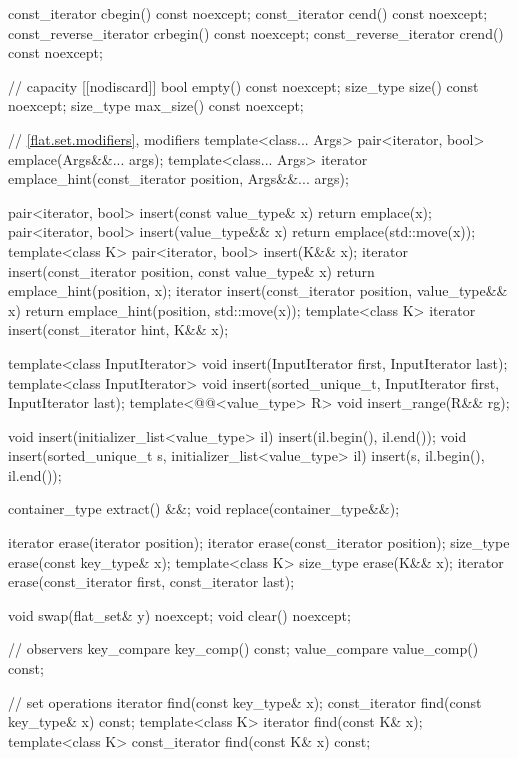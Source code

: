 \begin{codeblock}
{{    const_iterator         cbegin() const noexcept;
    const_iterator         cend() const noexcept;
    const_reverse_iterator crbegin() const noexcept;
    const_reverse_iterator crend() const noexcept;

    // capacity
    [[nodiscard]] bool empty() const noexcept;
    size_type size() const noexcept;
    size_type max_size() const noexcept;

    // \ref{flat.set.modifiers}, modifiers
    template<class... Args> pair<iterator, bool> emplace(Args&&... args);
    template<class... Args>
      iterator emplace_hint(const_iterator position, Args&&... args);

    pair<iterator, bool> insert(const value_type& x)
      { return emplace(x); }
    pair<iterator, bool> insert(value_type&& x)
      { return emplace(std::move(x)); }
    template<class K> pair<iterator, bool> insert(K&& x);
    iterator insert(const_iterator position, const value_type& x)
      { return emplace_hint(position, x); }
    iterator insert(const_iterator position, value_type&& x)
      { return emplace_hint(position, std::move(x)); }
    template<class K> iterator insert(const_iterator hint, K&& x);

    template<class InputIterator>
      void insert(InputIterator first, InputIterator last);
    template<class InputIterator>
      void insert(sorted_unique_t, InputIterator first, InputIterator last);
    template<@@<value_type> R>
      void insert_range(R&& rg);

    void insert(initializer_list<value_type> il)
      { insert(il.begin(), il.end()); }
    void insert(sorted_unique_t s, initializer_list<value_type> il)
      { insert(s, il.begin(), il.end()); }

    container_type extract() &&;
    void replace(container_type&&);

    iterator erase(iterator position);
    iterator erase(const_iterator position);
    size_type erase(const key_type& x);
    template<class K> size_type erase(K&& x);
    iterator erase(const_iterator first, const_iterator last);

    void swap(flat_set& y) noexcept;
    void clear() noexcept;

    // observers
    key_compare key_comp() const;
    value_compare value_comp() const;

    // set operations
    iterator find(const key_type& x);
    const_iterator find(const key_type& x) const;
    template<class K> iterator find(const K& x);
    template<class K> const_iterator find(const K& x) const;

}}
\end{codeblock}
